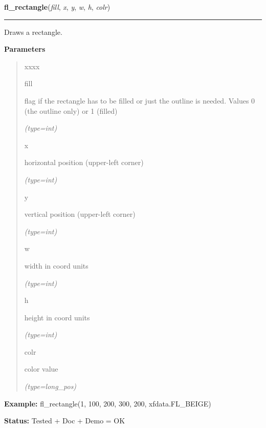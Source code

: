 \hspace{.8\funcindent}\begin{boxedminipage}{\funcwidth}

    \raggedright \textbf{fl\_rectangle}(\textit{fill}, \textit{x}, \textit{y}, \textit{w}, \textit{h}, \textit{colr})

    \vspace{-1.5ex}

    \rule{\textwidth}{0.5\fboxrule}
\setlength{\parskip}{2ex}
    Draws a rectangle.

\setlength{\parskip}{1ex}
      \textbf{Parameters}
      \vspace{-1ex}

      \begin{quote}
        \begin{Ventry}{xxxx}

          \item[fill]

          flag if the rectangle has to be filled or just the outline is 
          needed. Values 0 (the outline only) or 1 (filled)

            {\it (type=int)}

          \item[x]

          horizontal position (upper-left corner)

            {\it (type=int)}

          \item[y]

          vertical position (upper-left corner)

            {\it (type=int)}

          \item[w]

          width in coord units

            {\it (type=int)}

          \item[h]

          height in coord units

            {\it (type=int)}

          \item[colr]

          color value

            {\it (type=long\_pos)}

        \end{Ventry}

      \end{quote}

\textbf{Example:} fl\_rectangle(1, 100, 200, 300, 200, xfdata.FL\_BEIGE)



\textbf{Status:} Tested + Doc + Demo = OK



    \end{boxedminipage}

